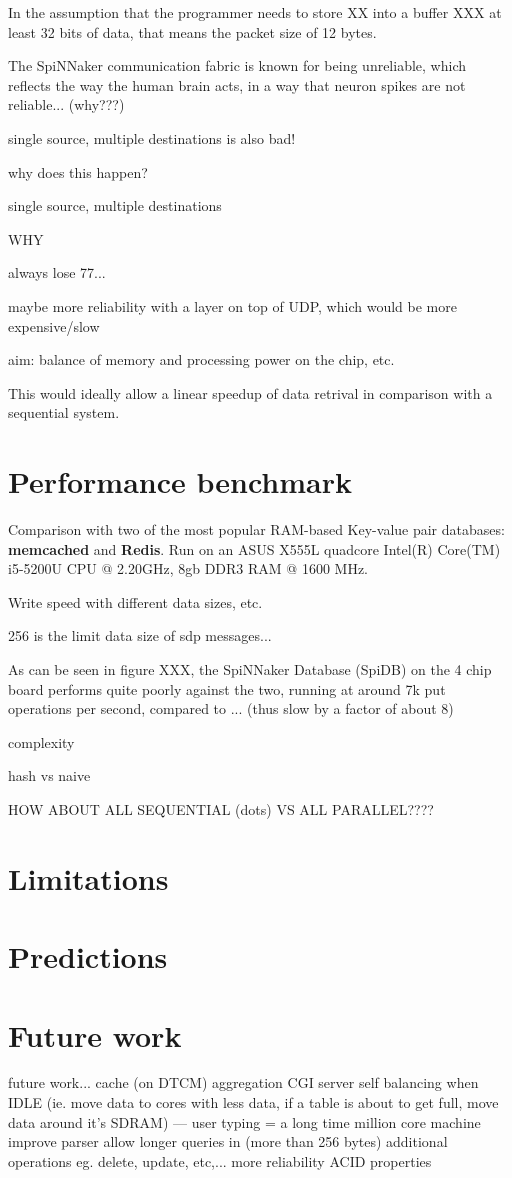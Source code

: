 In the assumption that the programmer needs to store XX into a buffer XXX
at least 32 bits of data, that means the packet size of 12 bytes.


The SpiNNaker communication fabric is known for being unreliable, which reflects the way the human brain acts, in a way that neuron spikes are not reliable... (why???)

single source, multiple destinations is also bad!

why does this happen?

single source, multiple destinations


WHY


always lose 77...

maybe more reliability with a layer on top of UDP, which would be more expensive/slow



aim: balance of memory and processing power on the chip, etc.


This would ideally allow a linear speedup of data retrival in comparison with a sequential system.


\section{Performance benchmark}

Comparison with two of the most popular RAM-based Key-value pair databases: \textbf{memcached} and \textbf{Redis}.
Run on an ASUS X555L quadcore Intel(R) Core(TM) i5-5200U CPU @ 2.20GHz, 8gb DDR3 RAM @ 1600 MHz.

Write speed with different data sizes, etc.

256 is the limit data size of sdp messages...

As can be seen in figure XXX, the SpiNNaker Database (SpiDB) on the 4 chip board performs quite poorly against the two, running at around 7k put operations per second, compared to ... (thus slow by a factor of about 8) 

complexity

hash vs naive

HOW ABOUT ALL SEQUENTIAL (dots) VS ALL PARALLEL????

\section{Limitations}

\section{Predictions}

\section{Future work}
future work...
cache (on DTCM)
aggregation
CGI server
self balancing when IDLE (ie. move data to cores with less data, if a table is about to get full, move data around it's SDRAM) --- user typing = a long time
million core machine
improve parser
allow longer queries in (more than 256 bytes)
additional operations eg. delete, update, etc,...
more reliability
ACID properties